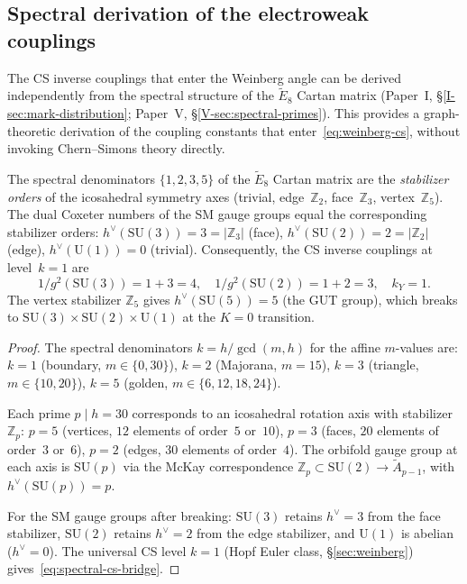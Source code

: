 \subsection{Spectral derivation of the electroweak couplings}
\label{sec:spectral-weinberg}

The CS inverse couplings that enter the Weinberg angle can be derived
independently from the spectral structure of the $\tilde{E}_8$ Cartan matrix
(Paper~I, \S\ref{I-sec:mark-distribution};
Paper~V, \S\ref{V-sec:spectral-primes}).
This provides a graph-theoretic derivation of the coupling constants
that enter~\eqref{eq:weinberg-cs}, without invoking Chern--Simons theory
directly.

\begin{lemma}\label{lem:spectral-bridge}
The spectral denominators $\{1, 2, 3, 5\}$ of the $\tilde{E}_8$
Cartan matrix are the \emph{stabilizer orders} of the icosahedral
symmetry axes (trivial, edge~$\mathbb{Z}_2$, face~$\mathbb{Z}_3$,
vertex~$\mathbb{Z}_5$).
The dual Coxeter numbers of the SM gauge groups equal
the corresponding stabilizer orders:
$h^\vee(\mathrm{SU}(3)) = 3 = |\mathbb{Z}_3|$ (face),
$h^\vee(\mathrm{SU}(2)) = 2 = |\mathbb{Z}_2|$ (edge),
$h^\vee(\mathrm{U}(1)) = 0$ (trivial).
Consequently, the CS inverse couplings at level~$k = 1$ are
\begin{equation}\label{eq:spectral-cs-bridge}
  1/g^2(\mathrm{SU}(3)) = 1 + 3 = 4, \quad
  1/g^2(\mathrm{SU}(2)) = 1 + 2 = 3, \quad
  k_Y = 1.
\end{equation}
The vertex stabilizer $\mathbb{Z}_5$ gives
$h^\vee(\mathrm{SU}(5)) = 5$ (the GUT group),
which breaks to $\mathrm{SU}(3) \times \mathrm{SU}(2) \times \mathrm{U}(1)$
at the $K = 0$ transition.
\end{lemma}

\begin{proof}
The spectral denominators $k = h/\gcd(m,h)$ for the affine
$m$-values are: $k = 1$ (boundary, $m \in \{0,30\}$),
$k = 2$ (Majorana, $m = 15$),
$k = 3$ (triangle, $m \in \{10,20\}$),
$k = 5$ (golden, $m \in \{6,12,18,24\}$).

Each prime $p \mid h = 30$ corresponds to an icosahedral
rotation axis with stabilizer $\mathbb{Z}_p$:
$p = 5$ (vertices, $12$ elements of order~$5$ or~$10$),
$p = 3$ (faces, $20$ elements of order~$3$ or~$6$),
$p = 2$ (edges, $30$ elements of order~$4$).
The orbifold gauge group at each axis is $\mathrm{SU}(p)$ via
the McKay correspondence $\mathbb{Z}_p \subset \mathrm{SU}(2)
\to \tilde{A}_{p-1}$, with $h^\vee(\mathrm{SU}(p)) = p$.

For the SM gauge groups after breaking: $\mathrm{SU}(3)$ retains
$h^\vee = 3$ from the face stabilizer,
$\mathrm{SU}(2)$ retains $h^\vee = 2$ from the edge stabilizer,
and $\mathrm{U}(1)$ is abelian ($h^\vee = 0$).
The universal CS level $k = 1$ (Hopf Euler class, \S\ref{sec:weinberg})
gives~\eqref{eq:spectral-cs-bridge}.
\end{proof}


